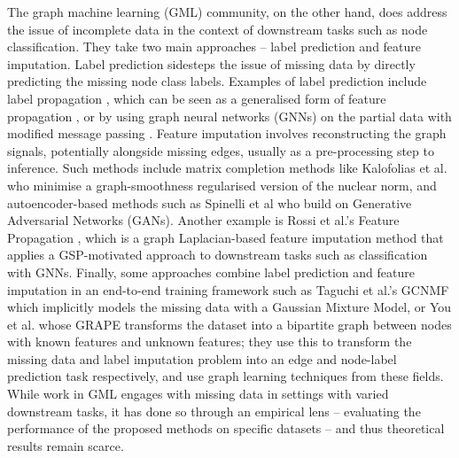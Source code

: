 The graph machine learning (GML) community, on the other hand, does address the issue of incomplete data in the context of downstream tasks such as node classification. They take two main approaches -- label prediction and feature imputation. Label prediction sidesteps the issue of missing data by directly predicting the missing node class labels. Examples of label prediction include label propagation \cite{zhu2003semi}, which can be seen as a generalised form of feature propagation \cite{belkin2004tikhonov}, or by using graph neural networks (GNNs) on the partial data with modified message passing \cite{jiang2020incomplete, chen2020learning}. Feature imputation involves reconstructing the graph signals, potentially alongside missing edges, usually as a pre-processing step to inference. Such methods include matrix completion methods like Kalofolias et al. \cite{kalofolias2014matrix} who minimise a graph-smoothness regularised version of the nuclear norm, and autoencoder-based methods such as Spinelli et al\cite{spinelli2020missing} who build on Generative Adversarial Networks (GANs). Another example is Rossi et al.'s Feature Propagation \cite{rossi2021unreasonable}, which is a graph Laplacian-based feature imputation method that applies a GSP-motivated approach to downstream tasks such as classification with GNNs. Finally, some approaches combine label prediction and feature imputation in an end-to-end training framework  such as Taguchi et al.'s GCNMF which implicitly models the missing data with a Gaussian  Mixture Model\cite{taguchi2021graph}, or You et al. \cite{you2020handling} whose GRAPE transforms the dataset into a bipartite graph between nodes with known features and unknown features; they use this to transform the missing data and label imputation problem into an edge and node-label prediction task respectively, and use graph learning techniques from these fields. While work in GML engages with missing data in settings with varied downstream tasks, it has done so through an empirical lens -- evaluating the performance of the proposed methods on specific datasets -- and thus theoretical results remain scarce.